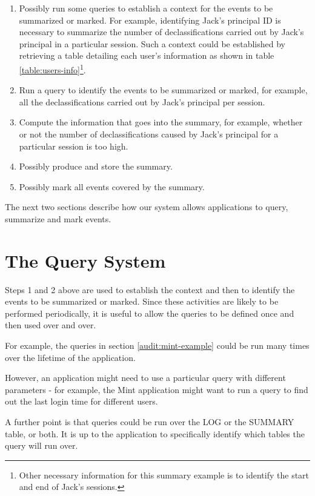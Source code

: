 \begin{enumerate}
  \item Possibly run some queries to establish a context for the events to be summarized or marked. For example, identifying Jack's principal ID is necessary to summarize the number of declassifications carried out by Jack's principal in a particular session. Such a context could be established by retrieving a table detailing each user's information as shown in table \ref{table:users-info}\footnote{Other necessary information for this summary example is to identify the start and end of Jack's sessions.}.
  \item Run a query to identify the events to be summarized or marked, for example, all the declassifications carried out by Jack's principal per session.
  \item Compute the information that goes into the summary, for example, whether or not the number of declassifications caused by Jack's principal for a particular session is too high.
  \item Possibly produce and store the summary.
  \item Possibly mark all events covered by the summary.
\end{enumerate}

\noindent
The next two sections describe how our system allows applications to query, summarize and mark events.

\section{The Query System}

Steps 1 and 2 above are used to establish the context and then to identify the events to be summarized or marked. Since these activities are likely to be performed periodically, it is useful to allow the queries to be defined once and then used over and over.


For example, the queries in section \ref{audit:mint-example} could be run many times over the lifetime of the application.

However, an application might need to use a particular query with different parameters - for example, the Mint application might want to run a query to find out the last login time for different users.

A further point is that queries could be run over the LOG or the SUMMARY table, or both. It is up to the application to specifically identify which tables the query will run over.

